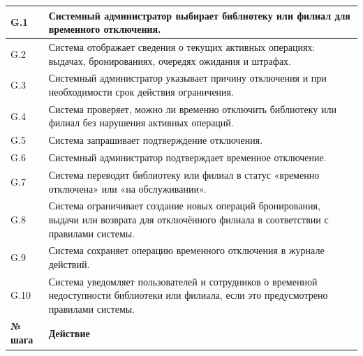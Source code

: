 \documentclass[12pt,a4paper]{article}
\begin{document}
\begin{xltabular}{\textwidth}{
				|>{\raggedright\arraybackslash}p{2.7cm}
				|>{\raggedright\arraybackslash}X|
			}
			G.1 & Системный администратор выбирает библиотеку или филиал для
			временного отключения. \\
			\hline
			G.2 & Система отображает сведения о текущих активных операциях:
			выдачах, бронированиях, очередях ожидания и штрафах. \\
			\hline
			G.3 & Системный администратор указывает причину отключения и при
			необходимости срок действия ограничения. \\
			\hline
			G.4 & Система проверяет, можно ли временно отключить библиотеку или
			филиал без нарушения активных операций. \\
			\hline
			G.5 & Система запрашивает подтверждение отключения. \\
			\hline
			G.6 & Системный администратор подтверждает временное отключение. \\
			\hline
			G.7 & Система переводит библиотеку или филиал в статус «временно
			отключена» или «на обслуживании». \\
			\hline
			G.8 & Система ограничивает создание новых операций бронирования, выдачи
			или возврата для отключённого филиала в соответствии с правилами
			системы. \\
			\hline
			G.9 & Система сохраняет операцию временного отключения в журнале действий. \\
			\hline
			G.10 & Система уведомляет пользователей и сотрудников о временной
			недоступности библиотеки или филиала, если это предусмотрено
			правилами системы. \\
			\hline
			
			
			\textbf{№ шага} & \textbf{Действие} \\
			\hline
			

\end{xltabular}
\end{document}

